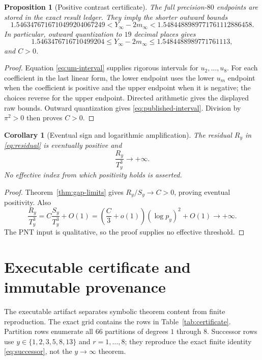 \documentclass[11pt]{article}
\newtheorem{proposition}[theorem]{Proposition}
\newtheorem{corollary}[theorem]{Corollary}
\theoremstyle{definition}
\theoremstyle{remark}
\begin{document}
\begin{proposition}[Positive contrast certificate]
\label{prop:positive}
The full precision-$80$ endpoints are stored in the exact result ledger.
They imply the shorter outward bounds
\[
 1.5463476716710499204067249
 <Y_\infty-2m_\infty
 <1.5484488989771761112886458.
\]
In particular, outward quantization to $19$ decimal places gives
\begin{equation}
 \boxed{1.5463476716710499204
 \le Y_\infty-2m_\infty
 \le1.5484488989771761113},
 \label{eq:published-interval}
\end{equation}
and $C>0$.
\end{proposition}

\begin{proof}
Equation \eqref{eq:um-interval} supplies rigorous intervals for
$u_2,\ldots,u_8$.  For each coefficient in the last linear form, the lower
endpoint uses the lower $u_m$ endpoint when the coefficient is positive and
the upper endpoint when it is negative; the choices reverse for the upper
endpoint.  Directed arithmetic gives the displayed raw bounds.  Outward
quantization gives \eqref{eq:published-interval}.  Division by $\pi^2>0$
then proves $C>0$.
\end{proof}

\begin{corollary}[Eventual sign and logarithmic amplification]
\label{cor:sign}
The residual $R_y$ in \eqref{eq:residual} is eventually positive and
\begin{equation}
 \frac{R_y}{T_y^3}\longrightarrow+\infty.
 \label{eq:amplification}
\end{equation}
No effective index from which positivity holds is asserted.
\end{corollary}

\begin{proof}
Theorem~\ref{thm:gap-limits} gives $R_y/S_y\to C>0$, proving eventual
positivity.  Also
\[
 \frac{R_y}{T_y^3}=C\frac{S_y}{T_y^3}+O(1)
 =\left(\frac{C}{3}+o(1)\right)(\log p_y)^2+O(1)
 \longrightarrow+\infty.
\]
The PNT input is qualitative, so the proof supplies no effective threshold.
\end{proof}

\section{Executable certificate and immutable provenance}
\label{sec:artifact}

The executable artifact separates symbolic theorem content from finite
reproduction.  The exact grid contains the rows in
Table~\ref{tab:certificate}.  Partition rows enumerate all $66$ partitions
of degrees $1$ through $8$.  Successor rows use
$y\in\{1,2,3,5,8,13\}$ and $r=1,\ldots,8$; they reproduce the exact finite
identity \eqref{eq:successor}, not the $y\to\infty$ theorem.
\end{document}
